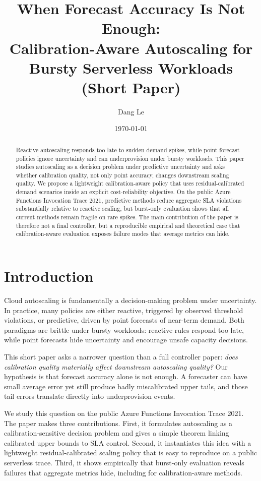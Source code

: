 \documentclass[11pt]{article}
\title{When Forecast Accuracy Is Not Enough:\\Calibration-Aware Autoscaling for Bursty Serverless Workloads (Short Paper)}
\author{Dang Le}
\date{\today}
\theoremstyle{plain}
\theoremstyle{definition}
\theoremstyle{remark}
\begin{document}
\maketitle

\begin{abstract}
Reactive autoscaling responds too late to sudden demand spikes, while point-forecast policies ignore uncertainty and can underprovision under bursty workloads. This paper studies autoscaling as a decision problem under predictive uncertainty and asks whether calibration quality, not only point accuracy, changes downstream scaling quality. We propose a lightweight calibration-aware policy that uses residual-calibrated demand scenarios inside an explicit cost-reliability objective. On the public Azure Functions Invocation Trace 2021, predictive methods reduce aggregate SLA violations substantially relative to reactive scaling, but burst-only evaluation shows that all current methods remain fragile on rare spikes. The main contribution of the paper is therefore not a final controller, but a reproducible empirical and theoretical case that calibration-aware evaluation exposes failure modes that average metrics can hide.
\end{abstract}

\section{Introduction}
Cloud autoscaling is fundamentally a decision-making problem under uncertainty. In practice, many policies are either reactive, triggered by observed threshold violations, or predictive, driven by point forecasts of near-term demand. Both paradigms are brittle under bursty workloads: reactive rules respond too late, while point forecasts hide uncertainty and encourage unsafe capacity decisions.

This short paper asks a narrower question than a full controller paper: \emph{does calibration quality materially affect downstream autoscaling quality?} Our hypothesis is that forecast accuracy alone is not enough. A forecaster can have small average error yet still produce badly miscalibrated upper tails, and those tail errors translate directly into underprovision events.

We study this question on the public Azure Functions Invocation Trace 2021. The paper makes three contributions. First, it formulates autoscaling as a calibration-sensitive decision problem and gives a simple theorem linking calibrated upper bounds to SLA control. Second, it instantiates this idea with a lightweight residual-calibrated scaling policy that is easy to reproduce on a public serverless trace. Third, it shows empirically that burst-only evaluation reveals failures that aggregate metrics hide, including for calibration-aware methods.
\end{document}
